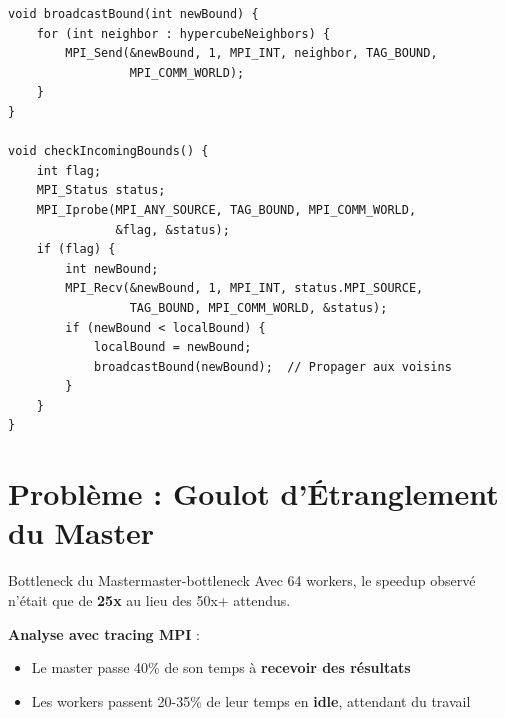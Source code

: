 \documentclass[12pt,a4paper,twoside]{report}
\begin{document}
\begin{lstlisting}[caption={Propagation de borne via voisins hypercube}]
void broadcastBound(int newBound) {
    for (int neighbor : hypercubeNeighbors) {
        MPI_Send(&newBound, 1, MPI_INT, neighbor, TAG_BOUND,
                 MPI_COMM_WORLD);
    }
}

void checkIncomingBounds() {
    int flag;
    MPI_Status status;
    MPI_Iprobe(MPI_ANY_SOURCE, TAG_BOUND, MPI_COMM_WORLD,
               &flag, &status);
    if (flag) {
        int newBound;
        MPI_Recv(&newBound, 1, MPI_INT, status.MPI_SOURCE,
                 TAG_BOUND, MPI_COMM_WORLD, &status);
        if (newBound < localBound) {
            localBound = newBound;
            broadcastBound(newBound);  // Propager aux voisins
        }
    }
}
\end{lstlisting}

\section{Problème : Goulot d'Étranglement du Master}

\begin{probleme}{Bottleneck du Master}{master-bottleneck}
Avec 64 workers, le speedup observé n'était que de \textbf{25x} au lieu des 50x+ attendus.

\textbf{Analyse avec tracing MPI} :
\begin{itemize}
    \item Le master passe 40\% de son temps à \textbf{recevoir des résultats}
    \item Les workers passent 20-35\% de leur temps en \textbf{idle}, attendant du travail
\end{itemize}
\end{probleme}
\end{document}

